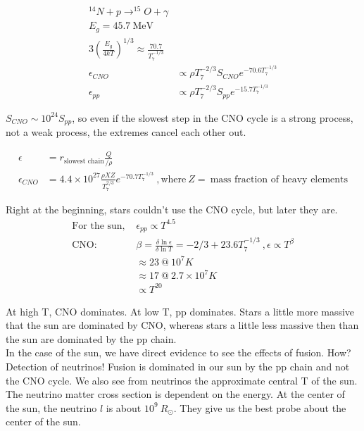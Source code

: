 \documentclass[10pt,letterpaper,final]{book}
\begin{document}
\begin{align}
^{14}N + p \rightarrow  ^{15}O + \gamma \\
E_g = 45.7 ~\text{MeV}\\
3 \left( \frac{E_g}{4kT}\right)^{1/3} \approx \frac{70.7}{T_7^{-1/3}}\\
\epsilon_{CNO} & \propto \rho T_7^{-2/3} S_{CNO} e^{-70.6 T_7^{-1/3}}\\
\epsilon_{pp}& \propto \rho T_7^{-2/3} S_{pp}e^{-15.7 T_7^{-1/3}}
\end{align}

$S_{CNO} \sim 10^{24} S_{pp}$, so even if the slowest step in the CNO cycle is a strong process, not a weak process, the extremes cancel each other out. 

\begin{align}
\epsilon &= r_{\text{slowest chain}} \frac{Q}{/\rho}\\
\epsilon_{CNO} &= 4.4 \times 10^{27} \frac{\rho XZ}{T_7^{2/3}} e^{-70.7 T_7 ^{-1/3}}~,\text{where}~ Z = ~\text{mass fraction of heavy elements}
\end{align}

Right at the beginning, stars couldn't use the CNO cycle, but later they are. \\

\begin{align}
\text{For the sun, } &\epsilon_{pp} \propto T^{4.5}\\
\text{CNO:} &\beta = \frac{\delta \ln \epsilon}{\delta \ln T} = -2/3 + 23.6 T_7^{-1/3}~, \epsilon \propto T^\beta\\
& \approx 23~ @~ 10^7 K\\
& \approx 17~@~ 2.7 \times 10^7K\\
& \propto T^{20}
\end{align}

At high T, CNO dominates. At low T, pp dominates. Stars a little more massive that the sun are dominated by CNO, whereas stars a little less massive then than the sun are dominated by the pp chain. \\

In the case of the sun, we have direct evidence to see the effects of fusion. How? Detection of neutrinos! Fusion is dominated in our sun by the pp chain and not the CNO cycle. We also see from neutrinos the approximate central T of the sun. \\

The neutrino matter cross section is dependent on the energy. At the center of the sun, the neutrino $l$ is about $10^9~R_\odot$. They give us the best probe about the center of the sun. \\
\end{document}
